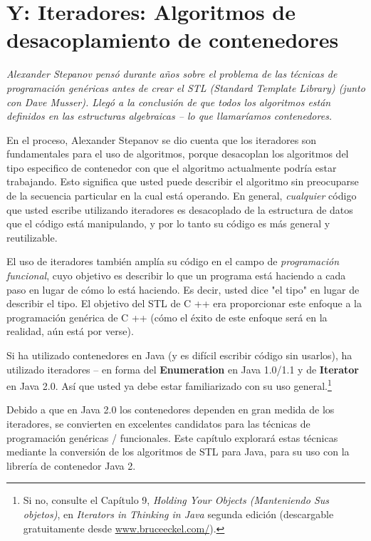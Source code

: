 \section*{\texorpdfstring{Y: Iteradores: \newline  Algoritmos de desacoplamiento de contenedores}{Y: Iteradores: Algoritmos de desacoplamiento de contenedores}}
\label{sec:yiadddc}


\textit{Alexander Stepanov pensó durante años sobre el problema de las técnicas de programación genéricas antes de crear el STL (Standard Template Library) (junto con Dave Musser). Llegó a la conclusión de que todos los algoritmos están definidos en las estructuras algebraicas – lo que llamaríamos contenedores.}

En el proceso, Alexander Stepanov se dio cuenta que los iteradores son fundamentales para el uso de algoritmos, porque desacoplan los algoritmos del tipo especifico de contenedor con que el algoritmo actualmente podría estar trabajando. Esto significa que usted puede describir el algoritmo sin preocuparse de la secuencia particular en la cual está operando. En general, \textit{cualquier} código que usted escribe utilizando iteradores es desacoplado de la estructura de datos que el código está manipulando, y por lo tanto su código es más general y reutilizable. \newline

El uso de iteradores también amplía su código en el campo de \textit{programación funcional}, cuyo objetivo es describir lo que un programa está haciendo a cada paso en lugar de cómo lo está haciendo. Es decir, usted dice "el tipo" en lugar de describir el tipo. El objetivo del STL de C ++ era proporcionar este enfoque a la programación genérica de C ++ (cómo el éxito de este enfoque será en la realidad, aún está por verse). \newline

Si ha utilizado contenedores en Java (y es difícil escribir código sin usarlos), ha utilizado iteradores – en forma del \textbf{Enumeration} en Java 1.0/1.1 y de \textbf{Iterator} en Java 2.0. Así que usted ya debe estar familiarizado con su uso general.\footnote{Si no, consulte el Capítulo 9, \textit{Holding Your Objects  (Manteniendo Sus objetos)}, en \textit{Iterators in Thinking in Java} segunda edición (descargable gratuitamente desde \url{www.bruceeckel.com/}).} \newline

Debido a que en Java 2.0 los contenedores dependen en gran medida de los iteradores, se convierten en excelentes candidatos para las técnicas de programación genéricas / funcionales. Este capítulo explorará estas técnicas mediante la conversión de los algoritmos de STL para Java, para su uso con la librería de contenedor Java 2.  \newline


